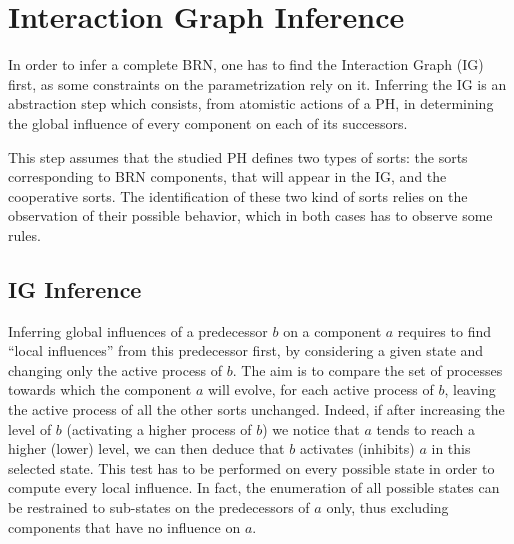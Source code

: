 \section{Interaction Graph Inference}\label{sec:infer-IG}

In order to infer a complete BRN, one has to find the Interaction Graph (IG) first, as some constraints on the parametrization rely on it.
Inferring the IG is an abstraction step which consists, from atomistic actions of a PH, in determining the global influence of every component on each of its successors.

This step assumes that the studied PH defines two types of sorts: the sorts corresponding to BRN components, that will appear in the IG, and the cooperative sorts.
The identification of these two kind of sorts relies on the observation of their possible behavior, which in both cases has to observe some rules.



\subsection*{IG Inference}\label{ssec:infer-IG}


Inferring global influences of a predecessor $b$ on a component $a$ requires to find “local influences” from this predecessor first, by considering a given state and changing only the active process of $b$.
The aim is to compare the set of processes towards which the component $a$ will evolve, for each active process of $b$, leaving the active process of all the other sorts unchanged.
Indeed, if after increasing the level of $b$ (\ie activating a higher process of $b$) we notice that $a$ tends to reach a higher (\resp lower) level, we can then deduce that $b$ activates (\resp inhibits) $a$ in this selected state.
This test has to be performed on every possible state in order to compute every local influence.
In fact, the enumeration of all possible states can be restrained to sub-states on the predecessors of $a$ only, thus excluding components that have no influence on $a$.

